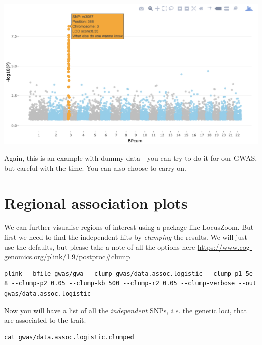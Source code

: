 \documentclass[
]{book}
\newenvironment{Shaded}{\begin{snugshade}}{\end{snugshade}}
\newcommand{\CommentTok}[1]{\textcolor[rgb]{0.56,0.35,0.01}{\textit{#1}}}
\newcommand{\FunctionTok}[1]{\textcolor[rgb]{0.00,0.00,0.00}{#1}}
\newcommand{\NormalTok}[1]{#1}
\newcommand{\OperatorTok}[1]{\textcolor[rgb]{0.81,0.36,0.00}{\textbf{#1}}}
\newcommand{\StringTok}[1]{\textcolor[rgb]{0.31,0.60,0.02}{#1}}
\newcommand{\VariableTok}[1]{\textcolor[rgb]{0.00,0.00,0.00}{#1}}
\begin{document}
\includegraphics{img/_gwas/interactive plot.png}

Again, this is an example with dummy data - you can try to do it for our GWAS, but careful with the time. You can also choose to carry on.

\hypertarget{regional-association-plots}{%
\section{Regional association plots}\label{regional-association-plots}}

We can further visualise regions of interest using a package like \href{http://locuszoom.org}{LocusZoom}. But first we need to find the independent hits by \emph{clumping} the results. We will just use the defaults, but please take a note of all the options here \url{https://www.cog-genomics.org/plink/1.9/postproc\#clump}

\begin{verbatim}
plink --bfile gwas/gwa --clump gwas/data.assoc.logistic --clump-p1 5e-8 --clump-p2 0.05 --clump-kb 500 --clump-r2 0.05 --clump-verbose --out gwas/data.assoc.logistic
\end{verbatim}

Now you will have a list of all the \emph{independent} SNPs, \emph{i.e.} the genetic loci, that are associated to the trait.

\begin{verbatim}
cat gwas/data.assoc.logistic.clumped
\end{verbatim}

\begin{Shaded}
\end{Shaded}
\end{document}
